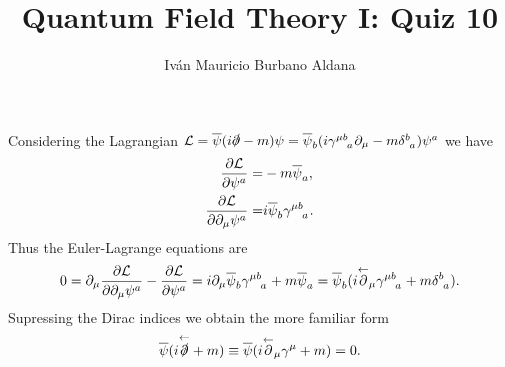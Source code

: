 \documentclass{article}
\author{Iván Mauricio Burbano Aldana}
\title{Quantum Field Theory I: Quiz 10}
\begin{document}
\maketitle

Considering the Lagrangian $\mathcal{L}=\overline{\psi}(i\slashed{\partial}-m)\psi=\overline{\psi}_b(i\gamma\indices{^{\mu b}_a}\partial_\mu-m\delta\indices{^b_a})\psi^a$ we have
\begin{equation}
\begin{aligned}
\pdv{\mathcal{L}}{\psi^a}=&-m\overline{\psi}_a,\\
\pdv{\mathcal{L}}{\partial_\mu\psi^a}=&i\overline{\psi}_b\gamma\indices{^{\mu b}_a}.
\end{aligned}
\end{equation}
Thus the Euler-Lagrange equations are 
\begin{equation}
0=\partial_\mu\pdv{\mathcal{L}}{\partial_\mu\psi^a}-\pdv{\mathcal{L}}{\psi^a}=i\partial_\mu\overline{\psi}_b\gamma\indices{^{\mu b}_a}+m\overline{\psi}_a=\overline{\psi}_b(i\overset{\leftarrow}{\partial}_\mu\gamma\indices{^{\mu b}_a}+m\delta\indices{^b_a}).
\end{equation}
Supressing the Dirac indices we obtain the more familiar form
\begin{equation}
\overline{\psi}(i\overset{\leftarrow}{\slashed{\partial}}+m)\equiv\overline{\psi}(i\overset{\leftarrow}{\partial}_\mu\gamma^\mu+m)=0.
\end{equation}
\end{document}
